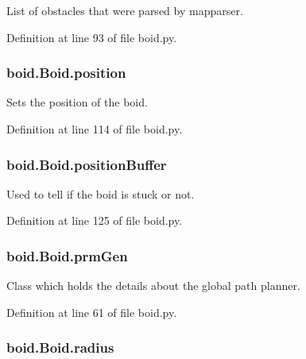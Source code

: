 List of obstacles that were parsed by mapparser. 



Definition at line 93 of file boid.\-py.

\hypertarget{classboid_1_1Boid_a483cb30093bc500a6123d5a801247ad5}{
\subsubsection[{position}]{\setlength{\rightskip}{0pt plus 5cm}boid.\-Boid.\-position}}\label{classboid_1_1Boid_a483cb30093bc500a6123d5a801247ad5}


Sets the position of the boid. 



Definition at line 114 of file boid.\-py.

\hypertarget{classboid_1_1Boid_ab6c778a50dd384fabc6aa48be04c0988}{
\subsubsection[{position\-Buffer}]{\setlength{\rightskip}{0pt plus 5cm}boid.\-Boid.\-position\-Buffer}}\label{classboid_1_1Boid_ab6c778a50dd384fabc6aa48be04c0988}


Used to tell if the boid is stuck or not. 



Definition at line 125 of file boid.\-py.

\hypertarget{classboid_1_1Boid_ac7d14690dde12ebc05f8f5ea80e29869}{
\subsubsection[{prm\-Gen}]{\setlength{\rightskip}{0pt plus 5cm}boid.\-Boid.\-prm\-Gen}}\label{classboid_1_1Boid_ac7d14690dde12ebc05f8f5ea80e29869}


Class which holds the details about the global path planner. 



Definition at line 61 of file boid.\-py.

\hypertarget{classboid_1_1Boid_a1bff2843c74b712aba274831d0a715d4}{
\subsubsection[{radius}]{\setlength{\rightskip}{0pt plus 5cm}boid.\-Boid.\-radius}}\label{classboid_1_1Boid_a1bff2843c74b712aba274831d0a715d4}


